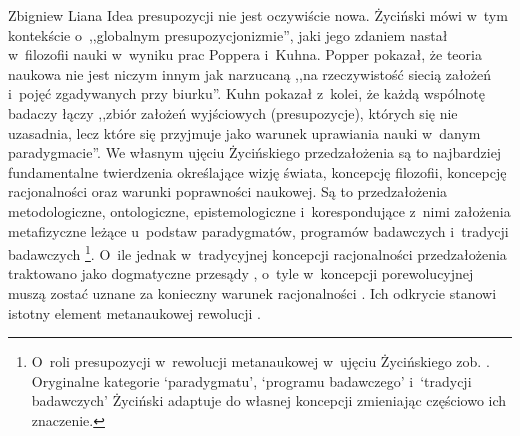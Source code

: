 \begin{artplenv}{Zbigniew Liana}
Idea presupozycji nie jest oczywiście nowa. Życiński
\parencite*[][s.~311n]{zycinski_granice_1993} %
 mówi w~tym kontekście o~,,globalnym presupozycjonizmie'', jaki jego zdaniem nastał w~filozofii nauki w~wyniku prac Poppera i~Kuhna. Popper pokazał, że teoria naukowa nie jest niczym innym jak narzucaną ,,na rzeczywistość siecią założeń i~pojęć zgadywanych przy biurku''. Kuhn pokazał z~kolei, że każdą wspólnotę badaczy łączy ,,zbiór założeń wyjściowych (presupozycje), których się nie uzasadnia, lecz które się przyjmuje jako warunek uprawiania nauki w~danym paradygmacie''. We własnym ujęciu Życińskiego przedzałożenia są to najbardziej fundamentalne twierdzenia określające wizję świata, koncepcję filozofii, koncepcję racjonalności oraz warunki poprawności naukowej. Są to przedzałożenia metodologiczne, ontologiczne, epistemologiczne i~korespondujące z~nimi założenia metafizyczne leżące u~podstaw paradygmatów, programów badawczych i~tradycji badawczych 
\parencites[][s.~7.133]{zycinski_teizm_1985}[][s.~21n.143]{zycinski_structure_1988}[][n. 37nn.253]{zycinski_struktura_2013_liana}%
\footnote{O~roli presupozycji w~rewolucji metanaukowej w~ujęciu Życińskiego zob. 
\parencite[][s.~173–177]{liana_nauka_2019_liana}. %
 Oryginalne kategorie ‘paradygmatu', ‘programu badawczego' i~‘tradycji badawczych' Życiński adaptuje do własnej koncepcji zmieniając częściowo ich znaczenie.}. O~ile jednak w~tradycyjnej koncepcji racjonalności przedzałożenia traktowano jako dogmatyczne przesądy 
\parencite[][s.~169n]{zycinski_teizm_1985}, %
 o~tyle w~koncepcji porewolucyjnej muszą zostać uznane za konieczny warunek racjonalności 
\parencite[][s.~129.157.172n]{zycinski_teizm_1985}. %
 Ich odkrycie stanowi istotny element metanaukowej rewolucji 
\parencites[][s.~143]{zycinski_structure_1988}[][s.~253]{zycinski_struktura_2013_liana}.%



\end{artplenv}
